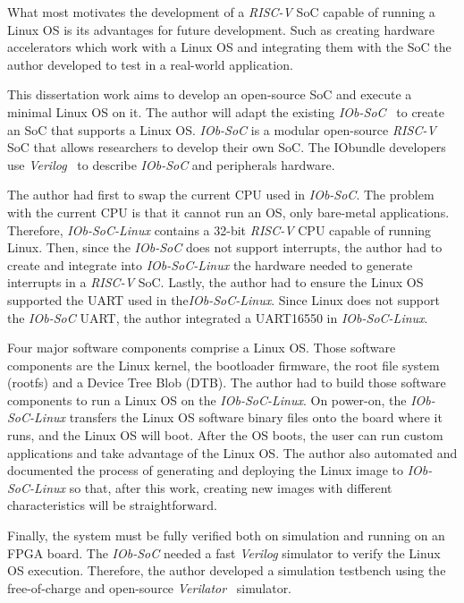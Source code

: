 What most motivates the development of a \textit{RISC-V} SoC capable of running a Linux OS is its advantages for future development. Such as creating hardware accelerators which work with a Linux OS and integrating them with the SoC the author developed to test in a real-world application.


This dissertation work aims to develop an open-source SoC and execute a minimal Linux OS on it. The author will adapt the existing \textit{IOb-SoC}~\cite{iob_soc} to create an SoC that supports a Linux OS. \textit{IOb-SoC} is a modular open-source \textit{RISC-V} SoC that allows researchers to develop their own SoC. The IObundle developers use \textit{Verilog}~\cite{thomas2008verilog} to describe \textit{IOb-SoC} and peripherals hardware.

The author had first to swap the current CPU used in \textit{IOb-SoC}. The problem with the current CPU is that it cannot run an OS, only bare-metal applications. Therefore, \textit{IOb-SoC-Linux} contains a 32-bit \textit{RISC-V} CPU capable of running Linux. Then, since the \textit{IOb-SoC} does not support interrupts, the author had to create and integrate into \textit{IOb-SoC-Linux} the hardware needed to generate interrupts in a \textit{RISC-V} SoC. Lastly, the author had to ensure the Linux OS supported the UART used in the\textit{IOb-SoC-Linux}. Since Linux does not support the \textit{IOb-SoC} UART, the author integrated a UART16550 in \textit{IOb-SoC-Linux}.

Four major software components comprise a Linux OS. Those software components are the Linux kernel, the bootloader firmware, the root file system (rootfs) and a Device Tree Blob (DTB). The author had to build those software components to run a Linux OS on the \textit{IOb-SoC-Linux}. On power-on, the \textit{IOb-SoC-Linux} transfers the Linux OS software binary files onto the board where it runs, and the Linux OS will boot. After the OS boots, the user can run custom applications and take advantage of the Linux OS. The author also automated and documented the process of generating and deploying the Linux image to \textit{IOb-SoC-Linux} so that, after this work, creating new images with different characteristics will be straightforward.

Finally, the system must be fully verified both on simulation and running on an FPGA board. The \textit{IOb-SoC} needed a fast \textit{Verilog} simulator to verify the Linux OS execution. Therefore, the author developed a simulation testbench using the free-of-charge and open-source \textit{Verilator}~\cite{snyder2010verilator} simulator.
